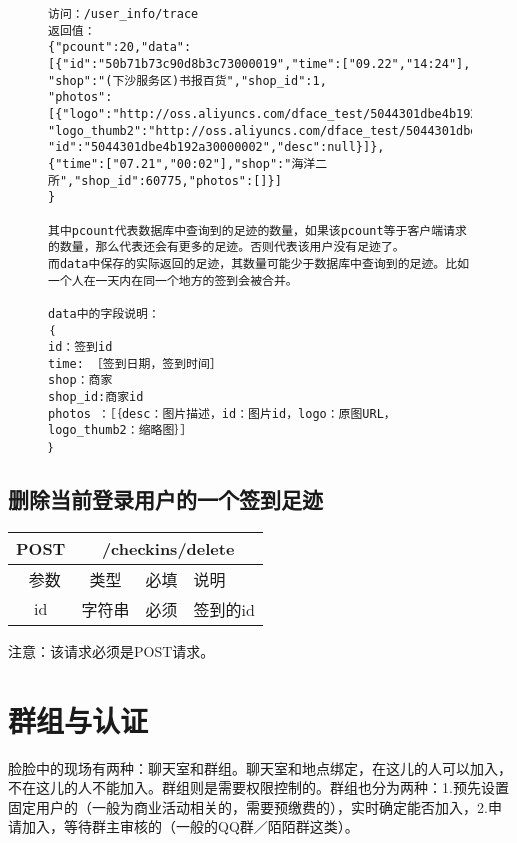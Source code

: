 \documentclass[cs4size]{ctexartutf8}
\begin{document}
\begin{figure}[H]
\begin{verbatim}
访问：/user_info/trace
返回值：
{"pcount":20,"data":
[{"id":"50b71b73c90d8b3c73000019","time":["09.22","14:24"],
"shop":"(下沙服务区)书报百货","shop_id":1,
"photos":[{"logo":"http://oss.aliyuncs.com/dface_test/5044301dbe4b192a30000002/0.jpg",
"logo_thumb2":"http://oss.aliyuncs.com/dface_test/5044301dbe4b192a30000002/t2_0.jpg",
"id":"5044301dbe4b192a30000002","desc":null}]},
{"time":["07.21","00:02"],"shop":"海洋二所","shop_id":60775,"photos":[]}]
}

其中pcount代表数据库中查询到的足迹的数量，如果该pcount等于客户端请求的数量，那么代表还会有更多的足迹。否则代表该用户没有足迹了。
而data中保存的实际返回的足迹，其数量可能少于数据库中查询到的足迹。比如一个人在一天内在同一个地方的签到会被合并。

data中的字段说明：
｛
id：签到id
time: ［签到日期，签到时间］
shop：商家
shop_id:商家id
photos ：［｛desc：图片描述，id：图片id，logo：原图URL，logo_thumb2：缩略图｝］
｝

\end{verbatim}
\end{figure}



\subsection{删除当前登录用户的一个签到足迹}

\begin{table}[H]
   \begin{center}
\begin{tabular}{|c|c|c|p{12cm}|}
\hline
POST & \multicolumn{3}{|c|}{/checkins/delete} \\
\hline\hline
 \  参数  & 类型 & 必填 &  说明  \\
   \hline
 id  & 字符串 & 必须 & 签到的id\\ 
 \hline
\end{tabular}
   \end{center}
\end{table}

注意：该请求必须是POST请求。


\section{群组与认证}
脸脸中的现场有两种：聊天室和群组。聊天室和地点绑定，在这儿的人可以加入，不在这儿的人不能加入。群组则是需要权限控制的。群组也分为两种：1.预先设置固定用户的（一般为商业活动相关的，需要预缴费的），实时确定能否加入，2.申请加入，等待群主审核的（一般的QQ群／陌陌群这类）。
\end{document}
